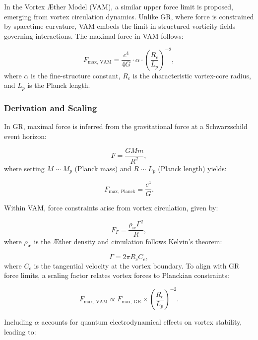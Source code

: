 In the Vortex Æther Model (VAM), a similar upper force limit is proposed, emerging from vortex circulation dynamics. Unlike GR, where force is constrained by spacetime curvature, VAM embeds the limit in structured vorticity fields governing interactions. The maximal force in VAM follows:


\begin{equation*}
    F_\text{max, VAM} = \frac{c^4}{4G} \cdot \alpha \cdot \left(\frac{R_c}{L_p}\right)^{-2},
\end{equation*}
where $\alpha$ is the fine-structure constant, $R_c$ is the characteristic vortex-core radius, and $L_p$ is the Planck length.


\subsubsection*{Derivation and Scaling}
In GR, maximal force is inferred from the gravitational force at a Schwarzschild event horizon:


\begin{equation*}
    F = \frac{GMm}{R^2},
\end{equation*}
where setting $M \sim M_p$ (Planck mass) and $R \sim L_p$ (Planck length) yields:


\begin{equation*}
    F_\text{max, Planck} = \frac{c^4}{G}.
\end{equation*}


Within VAM, force constraints arise from vortex circulation, given by:


\begin{equation*}
    F_{\Gamma} = \frac{\rho_\text{\ae} \Gamma^2}{R},
\end{equation*}
where $\rho_\text{\ae}$ is the Æther density and circulation follows Kelvin's theorem:


\begin{equation*}
    \Gamma = 2\pi R_c C_e,
\end{equation*}
where $C_e$ is the tangential velocity at the vortex boundary. To align with GR force limits, a scaling factor relates vortex forces to Planckian constraints:


\begin{equation*}
    F_\text{max, VAM} \propto F_\text{max, GR} \times \left(\frac{R_c}{L_p}\right)^{-2}.
\end{equation*}


Including $\alpha$ accounts for quantum electrodynamical effects on vortex stability, leading to:


